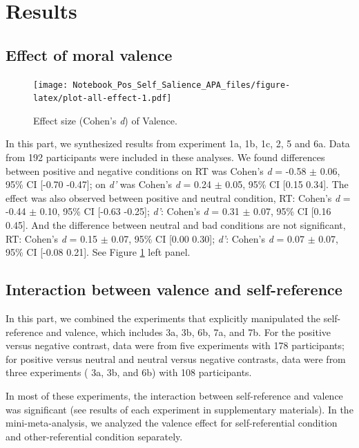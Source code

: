 \documentclass[
  english,
  man]{apa6}
\begin{document}
\hypertarget{results-9}{%
\section{Results}\label{results-9}}

\hypertarget{effect-of-moral-valence}{%
\subsection{Effect of moral valence}\label{effect-of-moral-valence}}

\begin{figure}
\centering
\texttt{[image: Notebook\_Pos\_Self\_Salience\_APA\_files/figure-latex/plot-all-effect-1.pdf]}
\caption{\label{fig:plot-all-effect}Effect size (Cohen's \emph{d}) of Valence.}
\end{figure}

In this part, we synthesized results from experiment 1a, 1b, 1c, 2, 5 and 6a. Data from 192 participants were included in these analyses. We found differences between positive and negative conditions on RT was Cohen's \emph{d} = -0.58 \(\pm\) 0.06, 95\% CI {[}-0.70 -0.47{]}; on \emph{d'} was Cohen's \emph{d} = 0.24 \(\pm\) 0.05, 95\% CI {[}0.15 0.34{]}. The effect was also observed between positive and neutral condition, RT: Cohen's \emph{d} = -0.44 \(\pm\) 0.10, 95\% CI {[}-0.63 -0.25{]}; \emph{d'}: Cohen's \emph{d} = 0.31 \(\pm\) 0.07, 95\% CI {[}0.16 0.45{]}. And the difference between neutral and bad conditions are not significant, RT: Cohen's \emph{d} = 0.15 \(\pm\) 0.07, 95\% CI {[}0.00 0.30{]}; \emph{d'}: Cohen's \emph{d} = 0.07 \(\pm\) 0.07, 95\% CI {[}-0.08 0.21{]}. See Figure \ref{fig:plot-all-effect} left panel.

\hypertarget{interaction-between-valence-and-self-reference}{%
\subsection{Interaction between valence and self-reference}\label{interaction-between-valence-and-self-reference}}

In this part, we combined the experiments that explicitly manipulated the self-reference and valence, which includes 3a, 3b, 6b, 7a, and 7b. For the positive versus negative contrast, data were from five experiments with 178 participants; for positive versus neutral and neutral versus negative contrasts, data were from three experiments ( 3a, 3b, and 6b) with 108 participants.

In most of these experiments, the interaction between self-reference and valence was significant (see results of each experiment in supplementary materials). In the mini-meta-analysis, we analyzed the valence effect for self-referential condition and other-referential condition separately.
\end{document}

